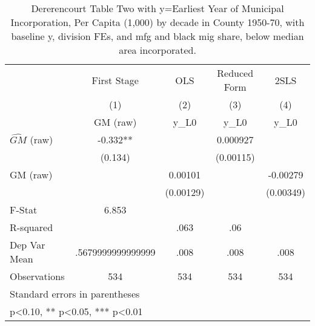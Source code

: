 \begin{table}[htbp]\centering
\def\sym#1{\ifmmode^{#1}\else\(^{#1}\)\fi}
\caption{Dererencourt Table Two with y=Earliest Year of Municipal Incorporation, Per Capita (1,000) by decade in County 1950-70, with baseline y, division FEs, and mfg and black mig share, below median area incorporated.}
\begin{tabular}{l*{4}{c}}
\toprule
                    & First Stage   &         OLS   &Reduced Form   &        2SLS   \\
                    &\multicolumn{1}{c}{(1)}&\multicolumn{1}{c}{(2)}&\multicolumn{1}{c}{(3)}&\multicolumn{1}{c}{(4)}\\
                    &\multicolumn{1}{c}{GM  (raw)}&\multicolumn{1}{c}{y\_L0}&\multicolumn{1}{c}{y\_L0}&\multicolumn{1}{c}{y\_L0}\\
\midrule
$\hat{GM}$ (raw)    &      -0.332** &               &    0.000927   &               \\
                    &     (0.134)   &               &   (0.00115)   &               \\
\addlinespace
GM  (raw)           &               &     0.00101   &               &    -0.00279   \\
                    &               &   (0.00129)   &               &   (0.00349)   \\
\midrule
F-Stat              &       6.853   &               &               &               \\
R-squared           &               &        .063   &         .06   &               \\
Dep Var Mean        &.5679999999999999   &        .008   &        .008   &        .008   \\
Observations        &         534   &         534   &         534   &         534   \\
\bottomrule
\multicolumn{5}{l}{\footnotesize Standard errors in parentheses}\\
\multicolumn{5}{l}{\footnotesize * p<0.10, ** p<0.05, *** p<0.01}\\
\end{tabular}
\end{table}
